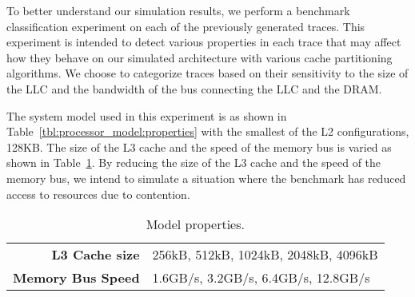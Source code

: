 To better understand our simulation results, we perform a benchmark classification experiment on each of the previously generated traces.
This experiment is intended to detect various properties in each trace that may affect how they behave on our simulated architecture with various cache partitioning algorithms.
We choose to categorize traces based on their sensitivity to the size of the LLC and the bandwidth of the bus connecting the LLC and the DRAM.

The system model used in this experiment is as shown in Table~\ref{tbl:processor_model:properties} with the smallest of the L2 configurations, 128KB.
The size of the L3 cache and the speed of the memory bus is varied as shown in Table~\ref{tbl:benchmarks_workloads:classification_model}.
By reducing the size of the L3 cache and the speed of the memory bus, we intend to simulate a situation where the benchmark has reduced access to resources due to contention.

\begin{table}[ht]
\centering
\begin{tabular}{rl}
\toprule
\bf{L3 Cache size} & 256kB, 512kB, 1024kB, 2048kB, 4096kB \\
\bf{Memory Bus Speed}   & 1.6GB/s, 3.2GB/s, 6.4GB/s, 12.8GB/s \\
\bottomrule                             
\end{tabular}
\caption{Model properties.}
\label{tbl:benchmarks_workloads:classification_model}
\end{table}

